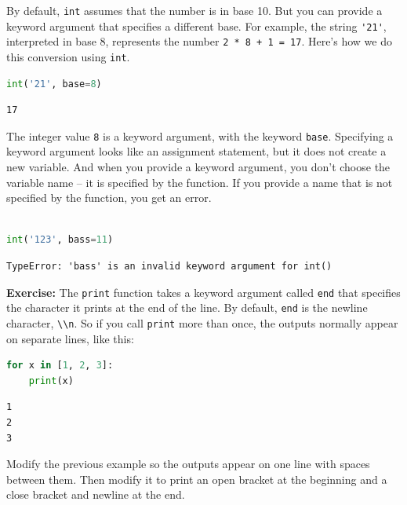 \documentclass[
]{book}
\newcommand{\passthrough}[1]{#1}
\begin{document}
By default, \passthrough{\lstinline!int!} assumes that the number is in
base 10. But you can provide a keyword argument that specifies a
different base. For example, the string \passthrough{\lstinline!'21'!},
interpreted in base 8, represents the number
\passthrough{\lstinline!2 * 8 + 1 = 17!}. Here's how we do this
conversion using \passthrough{\lstinline!int!}.

\begin{lstlisting}[language=Python]
int('21', base=8)
\end{lstlisting}

\begin{lstlisting}
17
\end{lstlisting}

The integer value \passthrough{\lstinline!8!} is a keyword argument,
with the keyword \passthrough{\lstinline!base!}. Specifying a keyword
argument looks like an assignment statement, but it does not create a
new variable. And when you provide a keyword argument, you don't choose
the variable name -- it is specified by the function. If you provide a
name that is not specified by the function, you get an error.

\begin{lstlisting}[language=Python]
%%expect TypeError

int('123', bass=11)
\end{lstlisting}

\begin{lstlisting}
TypeError: 'bass' is an invalid keyword argument for int()
\end{lstlisting}

\textbf{Exercise:} The \passthrough{\lstinline!print!} function takes a
keyword argument called \passthrough{\lstinline!end!} that specifies the
character it prints at the end of the line. By default,
\passthrough{\lstinline!end!} is the newline character,
\passthrough{\lstinline!\\n!}. So if you call
\passthrough{\lstinline!print!} more than once, the outputs normally
appear on separate lines, like this:

\begin{lstlisting}[language=Python]
for x in [1, 2, 3]:
    print(x)
\end{lstlisting}

\begin{lstlisting}
1
2
3
\end{lstlisting}

Modify the previous example so the outputs appear on one line with
spaces between them. Then modify it to print an open bracket at the
beginning and a close bracket and newline at the end.
\end{document}
